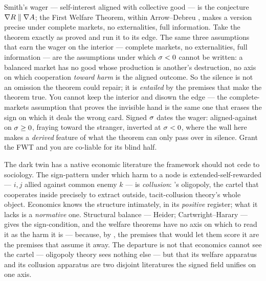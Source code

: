 \documentclass[../main]{subfiles}
\begin{document}
\begin{econ}[label=e:fwt, title={The invisible hand and its blind half}, ref=f:opp,
  cites={a:fwt}, departs=wall,
  stopsat={the premises that prove the interior are the premises that erase the sign}]
  Smith's wager --- self-interest aligned with collective good --- is the conjecture
  $\nabla R\parallel\nabla A$; the First Welfare Theorem, within
  Arrow--Debreu \parencite{a:fwt}, makes a version precise under complete markets, no
  externalities, full information. Take the theorem exactly as proved and run it to its edge.
  The same three assumptions that earn the wager on the interior --- complete markets, no
  externalities, full information --- are the assumptions under which $\sigma<0$ cannot be
  written: a balanced market has no good whose production is another's destruction, no axis
  on which cooperation \emph{toward harm} is the aligned outcome. So the silence is not an
  omission the theorem could repair; it is \emph{entailed} by the premises that make the
  theorem true. You cannot keep the interior and disown the edge --- the complete-markets
  assumption that proves the invisible hand is the same one that erases the sign on which it
  deals the wrong card. Signed $\sigma$ dates the wager: aligned-against on $\sigma\ge0$,
  fraying toward the stranger, inverted at $\sigma<0$, where the wall here makes a
  \emph{derived} feature of what the theorem can only pass over in silence. Grant the FWT and
  you are co-liable for its blind half.
\end{econ}

\begin{econ}[label=e:balance, title={Collusion as the welfare theorems' missing axis},
  ref=f:opp, cites={a:collusion,a:balance}, departs=wall,
  stopsat={welfare apparatus and collusion apparatus are disjoint literatures the field unifies}]
  The dark twin has a native economic literature the framework should not cede to sociology.
  The sign-pattern under which harm to a node is extended-self-rewarded --- $i,j$ allied
  against common enemy $k$ --- is \emph{collusion}: \textcite{a:collusion}'s oligopoly, the
  cartel that cooperates inside precisely to extract outside, tacit-collusion theory's whole
  object. Economics knows the structure intimately, in its \emph{positive} register; what it
  lacks is a \emph{normative} one. Structural balance --- Heider; Cartwright--Harary
  \parencite{a:balance} --- gives the sign-condition, and the welfare theorems have no axis
  on which to read it as the harm it is --- because, by , the premises that would
  let them score it are the premises that assume it away. The departure is not that economics
  cannot see the cartel --- oligopoly theory sees nothing else --- but that its welfare
  apparatus and its collusion apparatus are two disjoint literatures the signed field unifies
  on one axis.
\end{econ}
\end{document}
